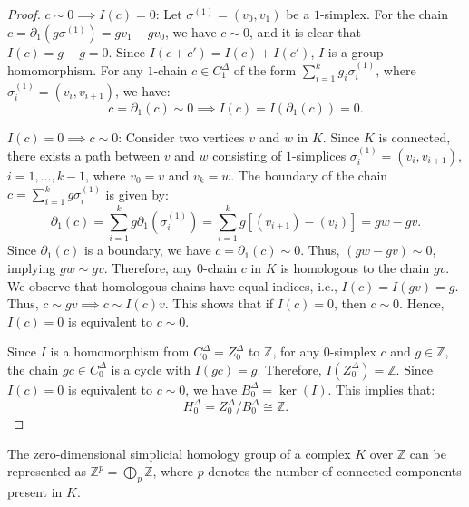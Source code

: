 \begin{proof}
    $c \sim 0 \implies I(c) = 0$: Let $\sigma^{(1)} = (v_0, v_1)$ be a $1$-simplex. For the chain $c = \partial_1(g \sigma^{(1)}) = g v_1 - g v_0$, we have $c \sim 0$, and it is clear that $I(c) = g - g = 0$. Since $I(c + c') = I(c) + I(c')$, $I$ is a group homomorphism. For any $1$-chain $c \in C^\Delta_1$ of the form $\sum_{i=1}^{k} g_i \sigma_i^{(1)}$, where $\sigma_i^{(1)} = (v_i, v_{i+1})$, we have:
    \[
        c = \partial_1(c) \sim 0 \implies I(c) = I(\partial_1(c)) = 0.
    \]

    $I(c) = 0 \implies c \sim 0$: Consider two vertices $v$ and $w$ in $K$. Since $K$ is connected, there exists a path between $v$ and $w$ consisting of $1$-simplices $\sigma_i^{(1)} = (v_i, v_{i+1})$, $i = 1, \ldots, k-1$, where $v_0 = v$ and $v_k = w$. The boundary of the chain $c = \sum_{i=1}^{k} g \sigma_i^{(1)}$ is given by:
    \[
        \partial_1(c) = \sum_{i=1}^{k} g \partial_1(\sigma_i^{(1)}) = \sum_{i=1}^{k} g [(v_{i+1}) - (v_i)] = g w - g v.
    \]
    Since $\partial_1(c)$ is a boundary, we have $c = \partial_1(c) \sim 0$. Thus, $(g w - g v) \sim 0$, implying $g w \sim g v$. Therefore, any $0$-chain $c$ in $K$ is homologous to the chain $g v$. We observe that homologous chains have equal indices, i.e., $I(c) = I(g v) = g$. Thus, $c \sim g v \implies c \sim I(c) v$. This shows that if $I(c) = 0$, then $c \sim 0$. Hence, $I(c) = 0$ is equivalent to $c \sim 0$.

    Since $I$ is a homomorphism from $C^\Delta_0 = Z^\Delta_0$ to $\mathbb{Z}$, for any $0$-simplex $c$ and $g \in \mathbb{Z}$, the chain $g c \in C^\Delta_0$ is a cycle with $I(g c) = g$. Therefore, $I(Z^\Delta_0) = \mathbb{Z}$. Since $I(c) = 0$ is equivalent to $c \sim 0$, we have $B^\Delta_0 = \ker(I)$. This implies that:
    \[
        H^\Delta_0 = Z^\Delta_0 / B^\Delta_0 \cong \mathbb{Z}.
    \]
\end{proof}

\begin{corollary}
    \label{directsum0hom}
    The zero-dimensional simplicial homology group of a complex $K$ over $\mathbb{Z}$ can be represented as $\mathbb{Z}^p = \bigoplus_p \mathbb{Z}$, where $p$ denotes the number of connected components present in $K$.
\end{corollary}



